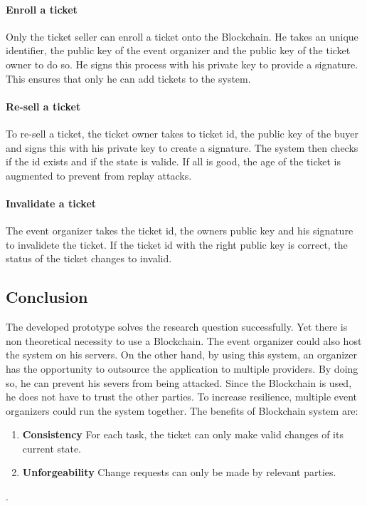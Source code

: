 \paragraph{Enroll a ticket}
Only the ticket seller can enroll a ticket onto the Blockchain. He takes an unique identifier, the public key of the event organizer and the public key of the ticket owner  to do so. He signs this process with his private key to provide a signature. This ensures that only he can add tickets to the system.
\paragraph{Re-sell a ticket}
To re-sell a ticket, the ticket owner takes to ticket id, the public key of the buyer and signs this with his private key to create a signature. The system then checks if the id exists and if the state is valide. If all is good, the age of the ticket is augmented to prevent from replay attacks.
\paragraph{Invalidate a ticket}
The event organizer takes the ticket id, the owners public key and his signature to invalidete the ticket. If the ticket id with the right public key is correct, the status of the ticket changes to invalid.

\subsection*{Conclusion}
The developed prototype solves the research question successfully. Yet there is non theoretical necessity to use a Blockchain. The event organizer could also host the system on his servers. On the other hand, by using this system, an organizer has the opportunity to outsource the application to multiple providers. By doing so, he can prevent his severs from being attacked. Since the Blockchain is used, he does not have to trust the other parties. To increase resilience, multiple event organizers could run the system together.
The benefits of Blockchain system are:
\begin{enumerate}[label={\arabic*)},font={\color{red!50!black}\bfseries}]
	\item \textbf{Consistency} For each task, the ticket can only make valid changes of its current state.
	\item \textbf{Unforgeability} Change requests can only be made by relevant parties.
\end{enumerate}.  